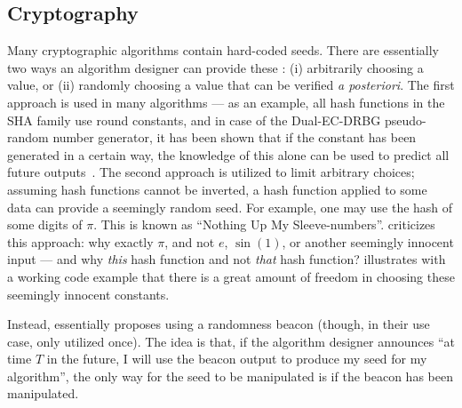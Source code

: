 \subsection{Cryptography}\label{subsec:usecase_cryptography}
Many cryptographic algorithms contain hard-coded seeds. There are essentially two ways an algorithm designer can provide these \cite{baigneres2015trap}: (i) arbitrarily choosing a value, or (ii) randomly choosing a value that can be verified \emph{a posteriori}.
The first approach is used in many algorithms --- as an example, all hash functions in the SHA family use round constants, and in case of the Dual-EC-DRBG pseudo-random number generator, it has been shown that if the constant has been generated in a certain way, the knowledge of this alone can be used to predict all future outputs~\cite{dualec-paper}.
The second approach is utilized to limit arbitrary choices; assuming hash functions cannot be inverted, a hash function applied to some data can provide a seemingly random seed. For example, one may use the hash of some digits of $\pi$. This is known as \enquote{Nothing Up My Sleeve-numbers}. \citet{bernstein2015manipulate} criticizes this approach: why exactly $\pi$, and not $e$, $\sin(1)$, or another seemingly innocent input --- and why \emph{this} hash function and not \emph{that} hash function?
\citet{backdoorsupmysleeve} illustrates with a working code example that there is a great amount of freedom in choosing these seemingly innocent constants.

Instead, \citet{baigneres2015trap} essentially proposes using a randomness beacon (though, in their use case, only utilized once). The idea is that, if the algorithm designer announces \enquote{at time $T$ in the future, I will use the beacon output to produce my seed for my algorithm}, the only way for the seed to be manipulated is if the beacon has been manipulated.

